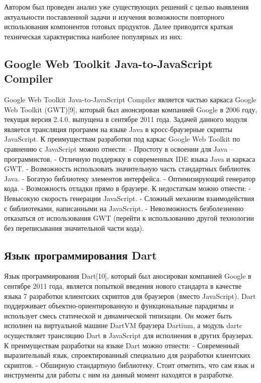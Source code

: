 Автором был проведен анализ уже существующих решений с целью выявления
актуальности поставленной задачи и изучения возможности повторного использования
компонентов готовых продуктов. Далее приводится краткая техническая характеристика
наиболее популярных из них:

\subsection{Google Web Toolkit Java-to-JavaScript Compiler}

Google Web Toolkit Java-to-JavaScript Compiler является частью каркаса Google Web
Toolkit (GWT)[9], который был анонсирован компанией Google в 2006 году, текущая версия
2.4.0. выпущена в сентябре 2011 года. Задачей данного модуля является трансляция
программ на языке Java в кросс-браузерные скрипты JavaScript.
К преимуществам разработки под каркас Google Web Toolkit по сравнению с
JavaScript можно отнести:
- Простоту в освоении для Java – программистов.
- Отличную поддержку в современных IDE языка Java и каркаса GWT.
- Возможность использовать значительную часть стандартных библиотек Java.
- Богатую библиотеку элементов интерфейса.
- Оптимизирующий генератор кода.
- Возможность отладки прямо в браузере.
К недостаткам можно отнести:
- Невысокую скорость генерации JavaScript.
- Сложный механизм взаимодействия с библиотеками, написанными на
JavaScript.
-
Невозможность безболезненно отказаться от использования GWT (перейти к
использованию другой технологии без переписывания значительной части
кода).

\subsection{Язык программирования Dart}

Язык программирования Dart[10], который был аносирован компанией Google в
сентябре 2011 года, является попыткой введения нового стандарта в качестве языка
7
разработки клиентских скриптов для браузеров (вместо JavaScript). Dart поддерживает
объектно-ориентированную и функциональные парадигмы и использует смесь статической и
динамической типизации. Он может быть исполнен на виртуальной машине DartVM
браузера Dartium, а модуль dartc осуществляет трансляцию Dart в JavaScript для исполнения
в других браузерах.
К преимуществам разработки на языке Dart можно отнести:
-
Современный выразительный язык, спроектированный специально для
разработки клиентских скриптов.
-
Обширную стандартную библиотеку.
Стоит отметить, что сам язык и инструменты для работы с ним на данный момент
находятся в разработке.

